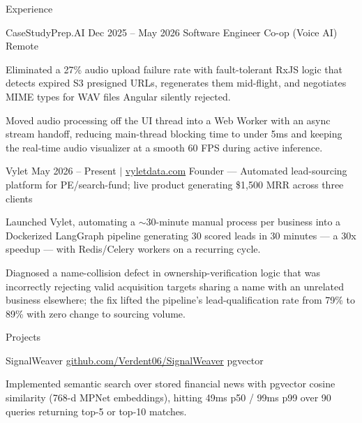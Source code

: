 \documentclass[
	11pt
]{../../../template}
\begin{document}
\begin{rSection}{E}{xperience}
		\begin{rSectionEntry}
			{CaseStudyPrep.AI}
			{Dec 2025 -- May 2026}
			{Software Engineer Co-op (Voice AI)}
			{}
			{Remote}

			\item Eliminated a 27\% audio upload failure rate with fault-tolerant RxJS logic that detects expired S3 presigned URLs, regenerates them mid-flight, and negotiates MIME types for WAV files Angular silently rejected.
			\item Moved audio processing off the UI thread into a Web Worker with an async stream handoff, reducing main-thread blocking time to under 5ms and keeping the real-time audio visualizer at a smooth 60 FPS during active inference.
		\end{rSectionEntry}

		\begin{rSectionEntry}
			{Vylet}
			{May 2026 -- Present $\vert$ \href{https://vyletdata.com}{vyletdata.com}}
			{Founder --- Automated lead-sourcing platform for PE/search-fund; live product generating \$1,500 MRR across three clients}
			{}
			{}

			\item Launched Vylet, automating a $\sim$30-minute manual process per business into a Dockerized LangGraph pipeline generating 30 scored leads in 30 minutes --- a 30x speedup --- with Redis/Celery workers on a recurring cycle.
			\item Diagnosed a name-collision defect in ownership-verification logic that was incorrectly rejecting valid acquisition targets sharing a name with an unrelated business elsewhere; the fix lifted the pipeline's lead-qualification rate from 79\% to 89\% with zero change to sourcing volume.
		\end{rSectionEntry}
	\end{rSection}

	\begin{rSection}{P}{rojects}
		\begin{rSectionEntry}
			{SignalWeaver}
			{\href{https://github.com/Verdent06/SignalWeaver}{github.com/Verdent06/SignalWeaver}}
			{}
			{pgvector}
			{}

			\item Implemented semantic search over stored financial news with pgvector cosine similarity (768-d MPNet embeddings), hitting 49ms p50 / 99ms p99 over 90 queries returning top-5 or top-10 matches.
		\end{rSectionEntry}
	\end{rSection}
\end{document}
